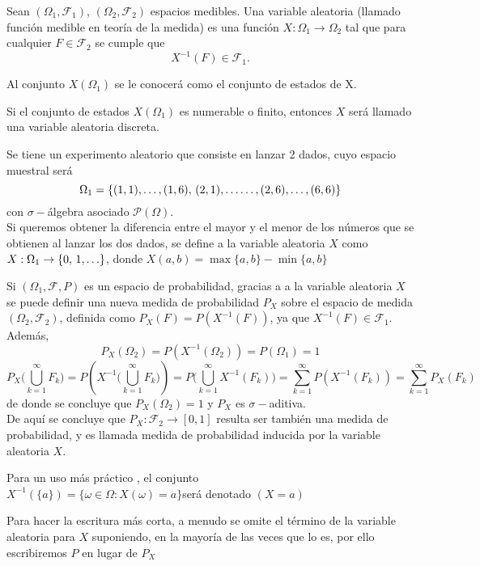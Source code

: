 \begin{Def}
    Sean $(\Omega_1,\mathscr{F}_1)$, $(\Omega_2,\mathscr{F}_2)$ espacios medibles. Una variable aleatoria (llamado función medible en teoría de la medida) es una función $X:\Omega_1\rightarrow \Omega_2$ tal que para cualquier $F\in\mathscr{F}_2$ se cumple que $$X^{-1}(F)\in\mathscr{F}_1.$$
\end{Def}
 Al conjunto $X(\Omega_1)$ se le conocerá como el conjunto de estados de X.\\
\begin{Obs}
    Si el conjunto de estados $X(\Omega_1)$ es numerable o finito, entonces $X$ será llamado una variable aleatoria discreta.
\end{Obs}
\begin{Ejm}
  Se tiene un experimento aleatorio que consiste en lanzar 2 dados, cuyo  espacio muestral será $$\Omega_1=\{(1,1),\ldots,(1,6),\thinspace(2,1),\ldots\ldots,(2,6),\ldots,(6,6)\}$$ con $\sigma-$álgebra asociado $\mathscr{P}(\Omega)$.\\ 
   Si queremos obtener la diferencia entre el mayor y el menor de los números que se obtienen al lanzar los dos dados, se define a la variable aleatoria $X$ como $X:\Omega_1\rightarrow \{0,\thinspace 1,\ldots\}$, donde $X(a,b)=\max \{a,b\}-\min\{a,b\}$
\end{Ejm}
Si $(\Omega_1,\mathscr{F},P)$ es un espacio de probabilidad, gracias a a la variable aleatoria $X$ se puede definir una nueva medida de probabilidad $P_X$ sobre el espacio de medida $(\Omega_2,\mathscr{F}_2)$, definida como $P_X(F)=P(X^{-1}(F))$, ya que $X^{-1}(F)\in\mathscr{F}_1$. Además, $$P_X(\Omega_2)=P(X^{-1}(\Omega_2))=P(\Omega_1)=1$$ $$P_X\big(\bigcup_{k=1}^\infty F_k\big)=P(X^{-1}\big(\bigcup_{k=1}^\infty
F_k\big))=P \big(\bigcup_{k=1}^\infty X^{-1}(F_k) \big)=\sum_{k=1}^\infty P(X^{-1}(F_k))=\sum_{k=1}^\infty P_X(F_k)$$
de donde se concluye que $P_X(\Omega_2)= 1$ y $P_X$ es $\sigma-$aditiva.\\
De aquí se concluye que $P_X:\mathscr{F_2}\rightarrow [0,1]$ resulta ser también una medida de probabilidad, y es llamada medida de probabilidad inducida por la variable aleatoria $X$.\\
\begin{Obs}
    Para un uso más práctico , el conjunto\\ $X^{-1}(\{a\})=\{\omega\in\Omega: X(\omega)=a\}$será denotado $(X= a)$\\
\end{Obs}
Para hacer la escritura más corta, a menudo se omite el término de la variable aleatoria para $X$ suponiendo, en la mayoría de las veces que lo es, por ello escribiremos $P$ en lugar de $P_X$\\\\
